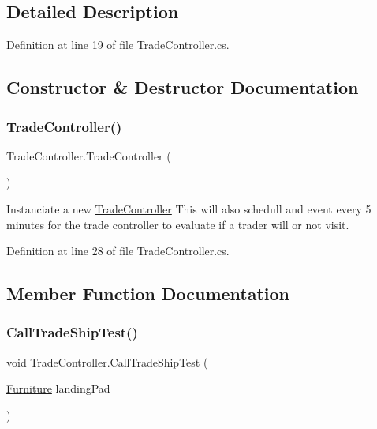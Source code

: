\subsection{Detailed Description}


Definition at line 19 of file Trade\+Controller.\+cs.



\subsection{Constructor \& Destructor Documentation}
\mbox{\label{class_trade_controller_a31ae81741652d739cada9e4748602eea}} 
\subsubsection{\texorpdfstring{Trade\+Controller()}{TradeController()}}
{\footnotesize\ttfamily Trade\+Controller.\+Trade\+Controller (\begin{DoxyParamCaption}{ }\end{DoxyParamCaption})}



Instanciate a new \hyperlink{class_trade_controller}{Trade\+Controller} This will also schedull and event every 5 minutes for the trade controller to evaluate if a trader will or not visit. 



Definition at line 28 of file Trade\+Controller.\+cs.



\subsection{Member Function Documentation}
\mbox{\label{class_trade_controller_a3399d14053c365d46014f16de0a6d06f}} 
\subsubsection{\texorpdfstring{Call\+Trade\+Ship\+Test()}{CallTradeShipTest()}}
{\footnotesize\ttfamily void Trade\+Controller.\+Call\+Trade\+Ship\+Test (\begin{DoxyParamCaption}\item[{\hyperlink{class_furniture}{Furniture}}]{landing\+Pad }\end{DoxyParamCaption})}



